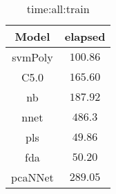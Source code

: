 \begin{table}[!ht]
	\centering
	\begin{tabular}{|c|c|}
		\hline
		Model & elapsed \\ \hline
		svmPoly & $100.86$ \\ \hline
		C5.0 & $165.60$ \\ \hline
		nb & $187.92$ \\ \hline
		nnet & $486.3$ \\ \hline
		pls & $49.86$ \\ \hline
		fda & $50.20$ \\ \hline
		pcaNNet & $289.05$ \\ \hline
	\end{tabular}
	\caption{time:all:train}
	\label{tab:time:all:train}
\end{table}
